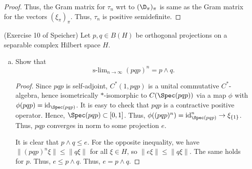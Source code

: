 \documentclass{article}
\begin{document}
\begin{proof}
Thus, the Gram matrix for $\tau_n$ wrt to $(\D_\pi)_\pi$ is same as the Gram matrix for the vectors $(\xi_\pi)_\pi$. Thus, $\tau_n$ is positive semidefinite.
\end{proof}

\DeclareMathOperator{\slim}{s-lim}
  
   (Exercise 10 of Speicher) Let $p,q \in B(H)$ be orthogonal projections on a separable complex Hilbert space $H$.
  \begin{enumerate}[(a)]
  \item Show that
    $$\slim_{n \to \infty} (pqp)^n = p \wedge q.$$
    \begin{proof}
      Since $pqp$ is self-adjoint, $C^*(1, pqp)$ is a unital commutative $C^*$-algebra, hence isometrically $*$-isomorphic to $C(\Spec(pqp))$ via a map $\phi$ with $\phi(pqp) = \id_{\Spec(pqp)}$.  It is easy to check that $pqp$ is a contractive positive operator. Hence, $\Spec(pqp) \subset [0,1]$.  Thus, $\phi((pqp)^n) = \id_{\Spec(pqp)}^n \to \xi_{\{1\}}$.  Thus, $pqp$ converges in norm to some projection $e$.

      It is clear that $p \wedge q \le e$.  For the opposite inequality, we have
      $\|(pqp)^n \xi\| \le \|q \xi\|$ for all $\xi \in H$, so $\|e \xi\| \le \|q \xi\|$.  The same holds for $p$.  Thus, $e \le p \wedge q$.  Thus, $e = p \wedge q$.
      
    \end{proof}
    
  \end{enumerate}
  
\end{document}
